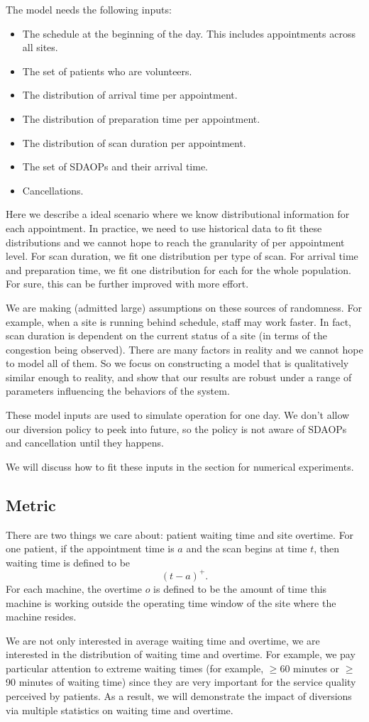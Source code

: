 The model needs the following inputs:
\begin{itemize}
\item The schedule at the beginning of the day. This includes
      appointments across all sites.
\item The set of patients who are volunteers.
\item The distribution of arrival time per appointment.
\item The distribution of preparation time per appointment.
\item The distribution of scan duration per appointment.
\item The set of SDAOPs and their arrival time.
\item Cancellations.
\end{itemize}
Here we describe a ideal scenario where we know distributional
information for each appointment. In practice, we need to
use historical data to fit these distributions and we cannot
hope to reach the granularity of per appointment level.
For scan duration, we fit one distribution per type of scan.
For arrival time and preparation time, we fit one distribution
for each for the whole population. For sure, this can be further
improved with more effort.

We are making (admitted large) assumptions on these sources of randomness.
For example, when a site is running behind schedule, staff
may work faster. In fact, scan duration is dependent on the current status
of a site (in terms of the congestion being observed).
There are many factors in reality and we cannot
hope to model all of them. So we focus on constructing a model
that is qualitatively similar enough to reality, and show that our
results are robust under a range of parameters influencing the
behaviors of the system.

These model inputs are used to simulate operation for one day.
We don't allow our diversion policy to peek into future, so
the policy is not aware of SDAOPs and cancellation until they
happens.

We will discuss how to fit these inputs in the section for
numerical experiments.

\subsection{Metric}

There are two things we care about: patient waiting time and
site overtime. For one patient, if the appointment time is $a$
and the scan begins at time $t$, then waiting time is defined
to be
\[  (t - a)^+. \]
For each machine, the overtime $o$ is defined to be the amount of
time this machine is working outside the operating time window
of the site where the machine resides.

We are not only interested in average waiting time and
overtime, we are interested in the distribution of waiting time
and overtime. For example, we pay particular attention to extreme
waiting times (for example, $\ge$60 minutes or $\ge$90 minutes of waiting time)
since they are very important for the service quality perceived by patients.
As a result, we will demonstrate the impact of diversions via
multiple statistics on waiting time and overtime.
